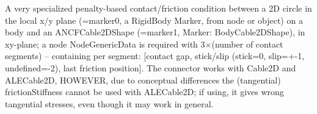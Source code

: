\ei

%
\newpage


\label{sec:item:ObjectContactFrictionCircleCable2D}
A very specialized penalty-based contact/friction condition between a 2D circle in the local x/y plane (=marker0, a RigidBody Marker, from node or object) on a body and an ANCFCable2DShape (=marker1, Marker: BodyCable2DShape), in xy-plane; a node NodeGenericData is required with 3$\times$(number of contact segments) -- containing per segment: [contact gap, stick/slip (stick=0, slip=+-1, undefined=-2), last friction position]. The connector works with Cable2D and ALECable2D, HOWEVER, due to conceptual differences the (tangential) frictionStiffness cannot be used with ALECable2D; if using, it gives wrong tangential stresses, even though it may work in general.
\vspace{12pt}\\

